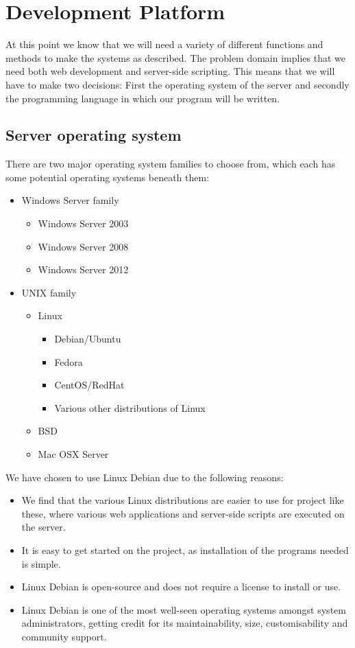 \section{Development Platform}
At this point we know that we will need a variety of different functions and methods to make the systems as described.
The problem domain implies that we need both web development and server-side scripting.
This means that we will have to make two decisions: First the operating system of the server and secondly the programming language in which our program will be written.

\subsection{Server operating system}
There are two major operating system families to choose from, which each has some potential operating systems beneath them:

\begin{itemize}
	\item Windows Server family
		\begin{itemize}
			\item Windows Server 2003
			\item Windows Server 2008
			\item Windows Server 2012
		\end{itemize}
	\item UNIX family
		\begin{itemize}
			\item Linux
				\begin{itemize}
					\item Debian/Ubuntu
					\item Fedora
					\item CentOS/RedHat
					\item Various other distributions of Linux
				\end{itemize}
			\item BSD
			\item Mac OSX Server
		\end{itemize}
\end{itemize}

We have chosen to use Linux Debian due to the following reasons:

\begin{itemize}
	\item We find that the various Linux distributions are easier to use for project like these, where various web applications and server-side scripts are executed on the server. 
	\item It is easy to get started on the project, as installation of the programs needed is simple.
	\item Linux Debian is open-source and does not require a license to install or use. 
	\item Linux Debian is one of the most well-seen operating systems amongst system administrators, getting credit for its maintainability, size, customisability and community support.\citep{why_debian}
\end{itemize}

